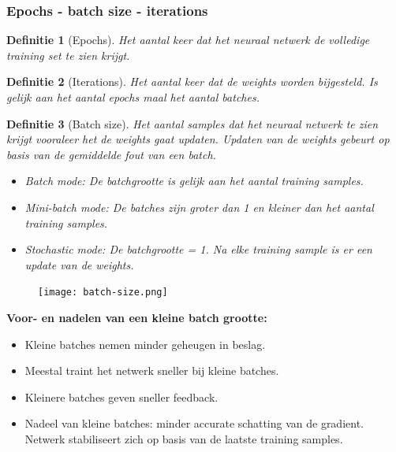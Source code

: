 \documentclass{article}
\newtheorem{theorem}{Definitie}[section]
\begin{document}
\subsubsection{Epochs - batch size - iterations}

\begin{theorem}[Epochs]
    Het aantal keer dat het neuraal netwerk de volledige training set te zien krijgt.
\end{theorem}

\begin{theorem}[Iterations]
    Het aantal keer dat de weights worden bijgesteld. 
    Is gelijk aan het aantal epochs maal het aantal batches.
\end{theorem}

\begin{theorem}[Batch size]
    Het aantal samples dat het neuraal netwerk te zien krijgt vooraleer het de
    weights gaat updaten. Updaten van de weights gebeurt op basis van de gemiddelde fout van
    een batch.

    \begin{itemize}
        \item Batch mode: De batchgrootte is gelijk aan het aantal training samples.
        \item Mini-batch mode: De batches zijn groter dan 1 en kleiner dan het aantal training samples.
        \item Stochastic mode: De batchgrootte = 1. Na elke training sample is er een update van de weights.
    \end{itemize}
\end{theorem}

\begin{figure}[H]
    \centering
    \texttt{[image: batch-size.png]}
    \caption{}
\end{figure}

\textbf{Voor- en nadelen van een kleine batch grootte:}

\begin{itemize}
    \item Kleine batches nemen minder geheugen in beslag.
    \item Meestal traint het netwerk sneller bij kleine batches.
    \item Kleinere batches geven sneller feedback.
    \item Nadeel van kleine batches: minder accurate schatting van de gradient. Netwerk stabiliseert zich op basis van de laatste training samples.
\end{itemize}
\end{document}
